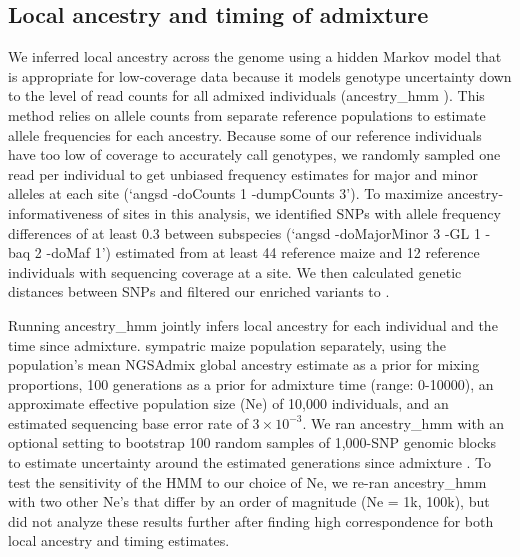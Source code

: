 \subsection*{Local ancestry and timing of admixture}
We inferred local ancestry across the genome using a hidden Markov model that is appropriate for low-coverage data because it models genotype uncertainty down to the level of read counts for all admixed individuals (ancestry\_hmm \cite{CorbettDetig:2017gh}). 
This method relies on allele counts from separate reference populations to estimate allele frequencies for each ancestry. 
Because some of our reference individuals have too low of coverage to accurately call genotypes, we randomly sampled one read per individual to get unbiased frequency estimates for major and minor alleles at each site (‘angsd -doCounts 1 -dumpCounts 3'). 
To maximize ancestry-informativeness of sites in this analysis, we identified SNPs with allele frequency differences of at least 0.3 between subspecies (‘angsd -doMajorMinor 3 -GL 1 -baq 2 -doMaf 1') estimated from at least 44 reference maize and 12 reference \mexicana individuals with sequencing coverage at a site.
We then calculated genetic distances between SNPs  and filtered our enriched variants to  . 

Running ancestry\_hmm jointly infers local ancestry for each individual and the time since admixture.  
 sympatric maize  \mexicana population separately, using the population's mean NGSAdmix global ancestry estimate as a prior for mixing proportions, 100 generations as a prior for admixture time (range: 0-10000), an approximate effective population size (Ne) of 10,000 individuals,  and an estimated sequencing base error rate of $3\times10^{-3}$. 
We ran ancestry\_hmm with an optional setting to bootstrap 100 random samples of 1,000-SNP genomic blocks to estimate uncertainty around the estimated generations since admixture . To test the sensitivity of the HMM to our choice of Ne, we re-ran ancestry\_hmm with two other Ne's that differ by an order of magnitude (Ne = 1k, 100k), but did not analyze these results further after finding high correspondence for both local ancestry and timing estimates. 

